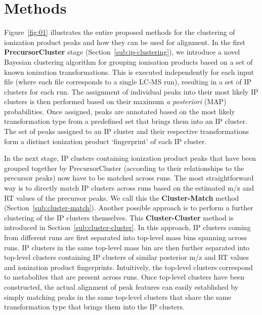 \section{Methods}

Figure~\ref{fig:01} illustrates the entire proposed methods for the clustering of ionization product peaks and how they can be used for alignment. In the first \textbf{PrecursorCluster} stage (Section~\ref{sub:ip-clustering}), we introduce a novel Bayesian clustering algorithm for grouping ionisation products based on a set of known ionization transformations. This is executed independently for each input file (where each file corresponds to a single LC-MS run), resulting in a set of IP clusters for each run. The assignment of individual peaks into their most likely IP clusters is then performed based on their maximum \textit{a posteriori} (MAP) probabilities. Once assigned, peaks are annotated based on the most likely transformation type from a predefined set that brings them into an IP cluster. The set of peaks assigned to an IP cluster and their respective transformations form a distinct ionization product `fingerprint' of each IP cluster. 

In the next stage, IP clusters containing ionization product peaks that have been grouped together by PrecursorCluster (according to their relationships to the precursor peaks) now have to be matched across runs. The most straightforward way is to directly match IP clusters across runs based on the estimated m/z and RT values of the precursor peaks. We call this the \textbf{Cluster-Match} method (Section~\ref{sub:cluster-match}). Another possible approach is to perform a further clustering of the IP clusters themselves. This \textbf{Cluster-Cluster} method is introduced in Section~\ref{sub:cluster-cluster}. In this approach, IP clusters coming from different runs are first separated into top-level mass bins spanning across runs. IP clusters in the same top-level mass bin are then further separated into top-level clusters containing IP clusters of similar posterior m/z and RT values and ionization product fingerprints. Intuitively, the top-level clusters correspond to metabolites that are present across runs. Once top-level clusters have been constructed, the actual alignment of peak features can easily established by simply matching peaks in the same top-level clusters that share the same transformation type that brings them into the IP clusters.

